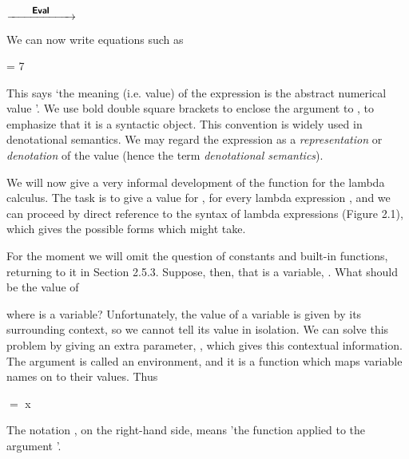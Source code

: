\begin{center}
         $\xrightarrow{\qquad\text{\normalsize {\sffamily\footnotesize \bfseries Eval}{}}\qquad}$ 
\end{center}

We can now write equations such as
\begin{mlcoded}
     = 7
\end{mlcoded}
This says `the meaning (i.e. value) of the expression  is the abstract
numerical value '. We use bold double square brackets to enclose the
argument to , to emphasize that it is a syntactic object. This convention is
widely used in denotational semantics. We may regard the expression 
as a \textit{representation} or \textit{denotation} of the value  (hence the term \textit{denotational semantics}).

We will now give a very informal development of the  function for the
lambda calculus. The task is to give a value for , for every lambda
expression , and we can proceed by direct reference to the syntax of lambda
expressions (Figure 2.1), which gives the possible forms which  might take.

For the moment we will omit the question of constants and built-in
functions, returning to it in Section 2.5.3. Suppose, then, that  is a variable,
. What should be the value of
\begin{mlcoded}
\end{mlcoded}
where  is a variable? Unfortunately, the value of a variable is given by its
surrounding context, so we cannot tell its value in isolation. We can solve this
problem by giving  an extra parameter, \tr{}, which gives this contextual
information. The argument \tr{} is called an environment, and it is a function
which maps variable names on to their values. Thus
\begin{mlcoded}
     \tr{} $=$ \tr{} x
\end{mlcoded}


The notation , on the right-hand side, means 'the function \ml{(\tr{})} applied to
the argument '.

